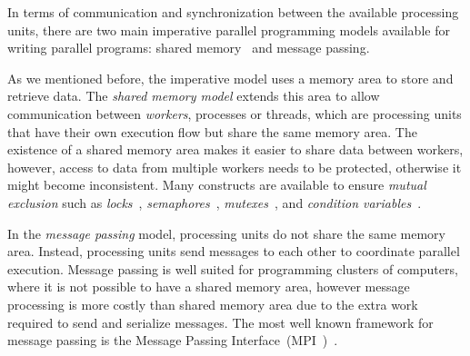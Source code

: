 In terms of communication and synchronization between the available processing
units, there are two main imperative parallel programming models available for
writing parallel programs: shared memory~\cite{Mellor-Crummey:1991} and message
passing.

As we mentioned before, the imperative model uses a memory area to store and
retrieve data. The \emph{shared memory model} extends this area to allow
communication between \emph{workers}, processes or threads, which are processing
units that have their own execution flow but share the same memory area. The
existence of a shared memory area makes it easier to share data between workers,
however, access to data from multiple workers needs to be protected, otherwise it
might become inconsistent. Many constructs are available to ensure \emph{mutual
exclusion} such as \emph{locks}~\cite{Silberschatz:2008},
\emph{semaphores}~\cite{Dijkstra:2002}, \emph{mutexes}~\cite{Silberschatz:2008},
and \emph{condition variables}~\cite{Hoare:1974}.

In the \emph{message passing} model, processing units do not share the same
memory area. Instead, processing units send messages to each other to coordinate
parallel execution. Message passing is well suited for programming clusters of
computers, where it is not possible to have a shared memory area, however
message processing is more costly than shared memory area due to the extra work
required to send and serialize messages.  The most well known framework for
message passing is the Message Passing Interface~(MPI~)~\cite{Forum:1994}.
